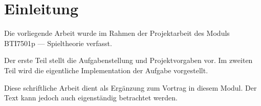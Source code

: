 \section{Einleitung}
\label{sec:introduction}
Die vorliegende Arbeit wurde im Rahmen der Projektarbeit des Moduls BTI7501p --- Spieltheorie verfasst.

Der erste Teil stellt die Aufgabenstellung und Projektvorgaben vor. Im zweiten Teil wird die eigentliche Implementation der Aufgabe vorgestellt.

Diese schriftliche Arbeit dient als Ergänzung zum Vortrag in diesem Modul.
Der Text kann jedoch auch eigenständig betrachtet werden.
